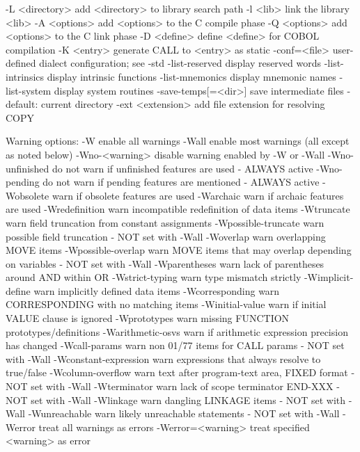  -L <directory>        add <directory> to library search path
  -l <lib>              link the library <lib>
  -A <options>          add <options> to the C compile phase
  -Q <options>          add <options> to the C link phase
  -D <define>           define <define> for COBOL compilation
  -K <entry>            generate CALL to <entry> as static
  -conf=<file>          user-defined dialect configuration; see -std
  -list-reserved        display reserved words
  -list-intrinsics      display intrinsic functions
  -list-mnemonics       display mnemonic names
  -list-system          display system routines
  -save-temps[=<dir>]   save intermediate files
                        - default: current directory
  -ext <extension>      add file extension for resolving COPY

Warning options:
  -W                    enable all warnings
  -Wall                 enable most warnings (all except as noted below)
  -Wno-<warning>        disable warning enabled by -W or -Wall
  -Wno-unfinished       do not warn if unfinished features are used
                        - ALWAYS active
  -Wno-pending          do not warn if pending features are mentioned
                        - ALWAYS active
  -Wobsolete            warn if obsolete features are used
  -Warchaic             warn if archaic features are used
  -Wredefinition        warn incompatible redefinition of data items
  -Wtruncate            warn field truncation from constant assignments
  -Wpossible-truncate   warn possible field truncation
                        - NOT set with -Wall
  -Woverlap             warn overlapping MOVE items
  -Wpossible-overlap    warn MOVE items that may overlap depending on variables
                        - NOT set with -Wall
  -Wparentheses         warn lack of parentheses around AND within OR
  -Wstrict-typing       warn type mismatch strictly
  -Wimplicit-define     warn implicitly defined data items
  -Wcorresponding       warn CORRESPONDING with no matching items
  -Winitial-value       warn if initial VALUE clause is ignored
  -Wprototypes          warn missing FUNCTION prototypes/definitions
  -Warithmetic-osvs     warn if arithmetic expression precision has changed
  -Wcall-params         warn non 01/77 items for CALL params
                        - NOT set with -Wall
  -Wconstant-expression  warn expressions that always resolve to true/false
  -Wcolumn-overflow     warn text after program-text area, FIXED format
                        - NOT set with -Wall
  -Wterminator          warn lack of scope terminator END-XXX
                        - NOT set with -Wall
  -Wlinkage             warn dangling LINKAGE items
                        - NOT set with -Wall
  -Wunreachable         warn likely unreachable statements
                        - NOT set with -Wall
  -Werror               treat all warnings as errors
  -Werror=<warning>     treat specified <warning> as error

